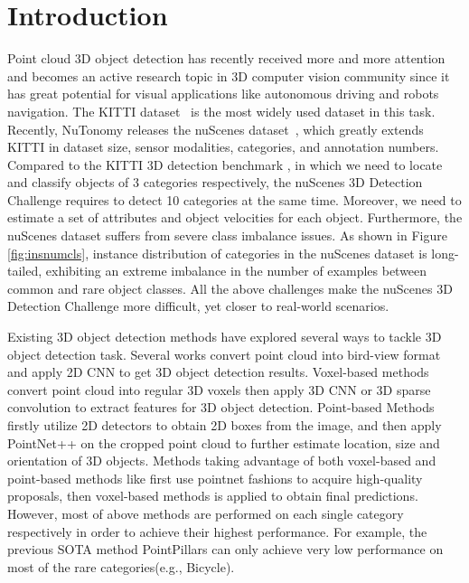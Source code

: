 \documentclass[10pt,twocolumn,letterpaper]{article}
\begin{document}
\section{Introduction}
Point cloud 3D object detection has recently received more and more attention and becomes an active research topic in 3D computer vision community since it has great potential for visual applications like autonomous driving and robots navigation. The KITTI dataset~\cite{Geiger2013IJRR} is the most widely used dataset in this task. Recently, NuTonomy releases the nuScenes dataset~\cite{nuscenes}, which greatly extends KITTI in dataset size, sensor modalities, categories, and annotation numbers. Compared to the KITTI 3D detection benchmark \cite{Geiger2012CVPR}, in which we need to locate and classify objects of 3 categories respectively, the nuScenes 3D Detection Challenge requires to detect 10 categories at the same time. Moreover, we need to estimate a set of attributes and object velocities for each object. Furthermore, the nuScenes dataset \cite{nuscenes} suffers from severe class imbalance issues. As shown in Figure \ref{fig:insnumcls}, instance distribution of categories in the nuScenes dataset is long-tailed, exhibiting an extreme imbalance in the number of examples between common and rare object classes. All the above challenges make the nuScenes 3D Detection Challenge more difficult, yet closer to real-world scenarios.

Existing 3D object detection methods have explored several ways to tackle 3D object detection task. Several works \cite{DBLP:journals/corr/ChenMWLX16,8594049, Liang_2018_ECCV,Yang_2018_CVPR,pointpillars} convert point cloud into bird-view format and apply 2D CNN to get 3D object detection results. Voxel-based methods \cite{7780463,Zhou_2018_CVPR,Yan_2018} convert point cloud into regular 3D voxels then apply 3D CNN or 3D sparse convolution \cite{DBLP:journals/corr/GrahamM17,DBLP:journals/corr/abs-1711-10275,DBLP:journals/corr/abs-1904-08755} to extract features for 3D object detection. Point-based Methods \cite{DBLP:journals/corr/abs-1711-08488,DBLP:journals/corr/abs-1711-10871} firstly utilize 2D detectors to obtain 2D boxes from the image, and then apply PointNet++ \cite{DBLP:journals/corr/QiSMG16,DBLP:journals/corr/QiYSG17} on the cropped point cloud to further estimate location, size and orientation of 3D objects. Methods taking advantage of both voxel-based and point-based methods like \cite{shi2019part,std2019yang,Shi_2019_CVPR} first use pointnet fashions to acquire high-quality proposals, then voxel-based methods is applied to obtain final predictions. However, most of above methods are performed on each single category respectively in order to achieve their highest performance. For example, the previous SOTA method PointPillars \cite{pointpillars} can only achieve very low performance on most of the rare categories(e.g., Bicycle).
\end{document}
